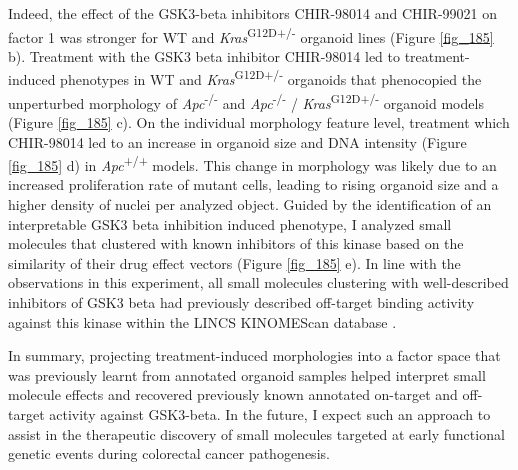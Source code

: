 \begin{flushleft}
Indeed, the effect of the GSK3-beta inhibitors CHIR-98014 and CHIR-99021 on factor 1 was stronger for WT and \textit{Kras}\textsuperscript{G12D+/-} organoid lines (Figure \ref{fig_185} b). Treatment with the GSK3 beta inhibitor CHIR-98014 led to treatment-induced phenotypes in WT and \textit{Kras}\textsuperscript{G12D+/-} organoids that phenocopied the unperturbed morphology of \textit{Apc}\textsuperscript{-/-} and \textit{Apc}\textsuperscript{-/-} / \textit{Kras}\textsuperscript{G12D+/-} organoid models (Figure \ref{fig_185} c). On the individual morphology feature level, treatment which CHIR-98014 led to an increase in organoid size and DNA intensity (Figure \ref{fig_185} d) in \textit{Apc}\textsuperscript{+/+} models. This change in morphology was likely due to an increased proliferation rate of mutant cells, leading to rising organoid size and a higher density of nuclei per analyzed object. Guided by the identification of an interpretable GSK3 beta inhibition induced phenotype, I analyzed small molecules that clustered with known inhibitors of this kinase based on the similarity of their drug effect vectors (Figure \ref{fig_185} e). In line with the observations in this experiment, all small molecules clustering with well-described inhibitors of GSK3 beta had previously described off-target binding activity against this kinase within the LINCS KINOMEScan database \parencite{subramanianNextGenerationConnectivity2017}. 
\par 

In summary, projecting treatment-induced morphologies into a factor space that was previously learnt from annotated organoid samples helped interpret small molecule effects and recovered previously known annotated on-target and off-target activity against GSK3-beta. In the future, I expect such an approach to assist in the therapeutic discovery of small molecules targeted at early functional genetic events during colorectal cancer pathogenesis.
\bigbreak

\end{flushleft}